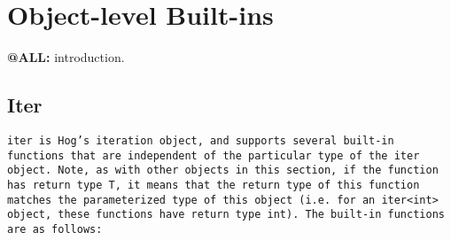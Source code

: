 \documentclass{book}
\begin{document}

\section{Object-level Built-ins} %
\label{sec:object_level_built_ins}

\textbf{@ALL:} introduction.

\subsection{Iter} %
\label{sub:iter}

\tt iter \rm is Hog's iteration object, and supports several built-in functions
that are independent of the particular type of the \tt iter \rm object. Note, 
as with other objects in this section, if the function has return type T, it 
means that the return type of this function matches the parameterized type of
this object (i.e. for an \tt iter<int> \rm object, these functions have return
type \tt int\rm). The built-in functions are as follows:
\end{document}
